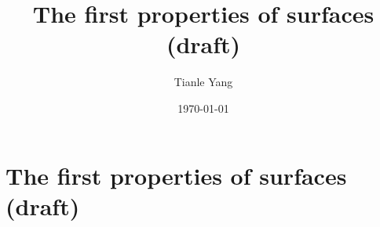 \documentclass{noteformyself}
\title{The first properties of surfaces (draft)}
\author{Tianle Yang}
\date{\today}
\begin{document}
    \maketitle

    \section{The first properties of surfaces (draft)}



\end{document}
